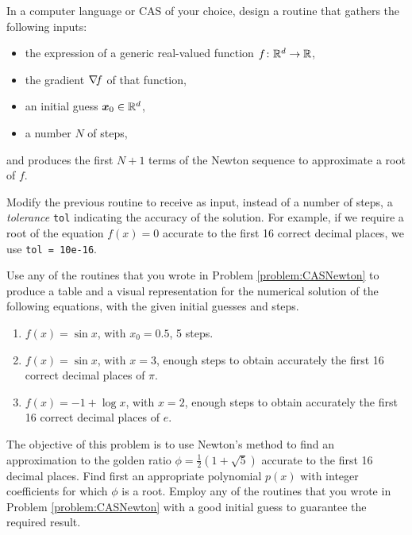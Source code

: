 \begin{problem}[CAS]\label{problem:CASNewton}
In a computer language or CAS of your choice, design a routine that gathers the following inputs:
\begin{itemize}
\item the expression of a generic real-valued function $f\colon \mathbb{R}^d \to \mathbb{R}$, 
\item the gradient $\mathop{\nabla\! {f}}$ of that function,
\item an initial guess $\boldsymbol{x}_0 \in \mathbb{R}^d$, 
\item a number $N$ of steps,
\end{itemize}
and produces the first $N+1$ terms of the Newton sequence to approximate a root of $f$.

Modify the previous routine to receive as input, instead of a number of steps, a \emph{tolerance} \texttt{tol} indicating the accuracy of the solution.  For example, if we require a root of the equation $f(x)=0$ accurate to the first 16 correct decimal places, we use \texttt{tol = 10e-16}.
\end{problem}

\begin{problem}[CAS]
Use any of the routines that you wrote in Problem \ref{problem:CASNewton} to produce a table and a visual representation for the numerical solution of the following equations, with the given initial guesses and steps.
\begin{enumerate}
\item $f(x) = \sin x$, with $x_0=0.5$, 5 steps.
\item $f(x) = \sin x$, with $x=3$, enough steps to obtain accurately the first 16 correct decimal places of $\pi$.
\item $f(x) = -1+\log x$, with $x=2$, enough steps to obtain accurately the first 16 correct decimal places of $e$.
\end{enumerate}
\end{problem}

\begin{problem}[CAS]
The objective of this problem is to use Newton's method to find an approximation to the golden ratio $\phi=\frac{1}{2}(1+\sqrt{5})$ accurate to the first 16 decimal places.  Find first an appropriate polynomial $p(x)$ with integer coefficients for which $\phi$ is a root.  Employ any of the routines that you wrote in Problem \ref{problem:CASNewton} with a good initial guess to guarantee the required result.
\end{problem}


